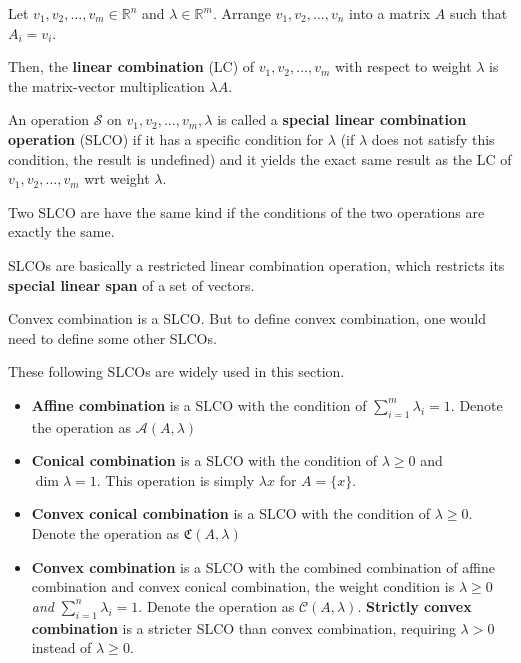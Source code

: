 \begin{definition}
  Let \( v_{1}, v_{2}, \ldots , v_{m} \in \mathbb{R}^{n} \) and \( \lambda \in
  \mathbb{R}^{m} \). Arrange \( v_{1}, v_{2}, \ldots , v_{n} \) into a matrix \(
  A\) such that \( A_{i} = v_{i} \).

  Then, the \textbf{linear combination} (LC) of \( v_{1}, v_{2}, \ldots, v_{m}
  \) with respect to weight \( \lambda \) is the matrix-vector multiplication \(
  \lambda A\).

  An operation \( \mathcal{S} \) on \( v_{1}, v_{2}, \ldots , v_{m}, \lambda \)
  is called a \textbf{special linear combination operation} (SLCO) if it has a specific
  condition for \( \lambda \) (if \( \lambda \) does not satisfy this condition,
  the result is undefined) and it yields the exact same result as the LC of \(
  v_{1}, v_{2}, \ldots , v_{m} \) wrt weight \( \lambda \).

  Two SLCO are have the same kind if the conditions of the two operations are
  exactly the same.
\end{definition}

SLCOs are basically a restricted linear combination operation, which restricts
its \textbf{special linear span} of a set of vectors.

Convex combination is a SLCO. But to define convex combination, one would need
to define some other SLCOs.

\begin{definition}
  These following SLCOs are widely used in this section.
\begin{itemize}
  \item \textbf{Affine combination} is a SLCO with the condition of \( \sum_{i =
    1}^{m} \lambda_{i} = 1 \). Denote the operation as \(
    \mathcal{A}(A, \lambda) \)
  \item \textbf{Conical combination} is a SLCO with the condition of \( \lambda
    \ge 0 \) and \( \operatorname{dim} \lambda = 1 \). This operation is simply
    \( \lambda x \) for \( A = \{x\}   \).
  \item \textbf{Convex conical combination} is a SLCO with the condition of
    \( \lambda \ge  0\). Denote the operation as \( \mathfrak{C}(A, \lambda)
    \)
  \item \textbf{Convex combination} is a SLCO with the combined combination of
    affine combination and convex conical combination, the weight condition is \(
    \lambda \ge 0 \) \textit{and} \( \sum_{i = 1}^{n} \lambda_{i} = 1 \). Denote
    the operation as \( \mathcal{C}(A, \lambda) \). \textbf{Strictly convex
    combination} is a stricter SLCO than convex combination, requiring
    \( \lambda > 0 \) instead of \( \lambda \ge 0 \).

\end{itemize}
\end{definition}


